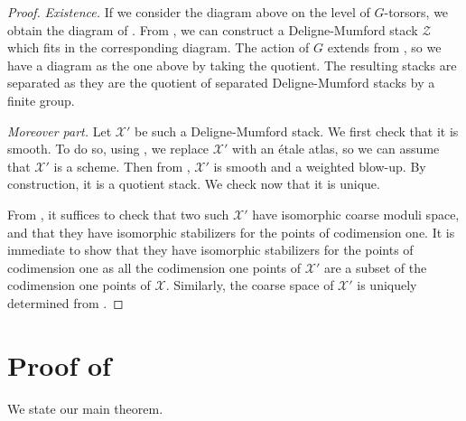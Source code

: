 \documentclass{amsart}
\newcommand{\cX}{\mathcal{X}}
\newcommand{\cY}{\mathcal{Y}}
\newcommand{\cZ}{\mathcal{Z}}
\theoremstyle{definition}
\newcommand{\marg}[1]{\normalsize{{\color{red}\footnote{{\color{blue}#1}}}{\marginpar[{\color{red}\hfill\tiny\thefootnote$\rightarrow$}]{{\color{red}$\leftarrow$\tiny\thefootnote}}}}}
\newcommand{\Gio}[1]{\marg{(Giovanni) #1}}
\newcommand{\Mich}[1]{\marg{(Michele) #1}}
\begin{document}
\begin{proof}
    \textit{Existence.} If we consider the diagram above on the level of $G$-torsors, we obtain the diagram of . From , we can construct a Deligne-Mumford stack $\cZ$ which fits in the corresponding diagram. The action of $G$ extends from , so we have a diagram as the one above by taking the quotient. The resulting stacks are separated as they are the quotient of separated Deligne-Mumford stacks by a finite group.

    \textit{Moreover part.} Let $\cX'$ be such a Deligne-Mumford stack. We first check that it is smooth. To do so, using , we replace $\cX'$ with an \'etale atlas, so we can assume that $\cX'$ is a scheme. Then from , $\cX'$ is smooth and a weighted blow-up. By construction, it is a quotient stack. We check now that it is unique.
    
From , it suffices to check that two such $\cX'$ have isomorphic coarse moduli space, and that they have isomorphic stabilizers for the points of codimension one. It is immediate to show that they have isomorphic stabilizers for the points of codimension one as all the codimension one points of $\cX'$ are a subset of the codimension one points of $\cX$. Similarly, the coarse space of $\cX'$ is uniquely determined from .
\end{proof}

\section{Proof of }\label{section_pf_thm}

We state our main theorem. 
\end{document}
